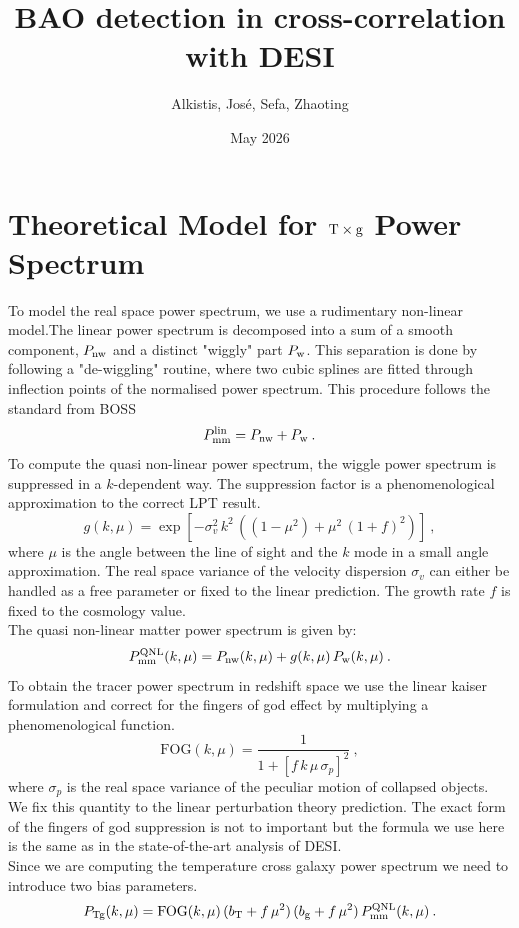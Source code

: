 \documentclass{article}
\title{BAO detection in cross-correlation with DESI}
\author{Alkistis, José, Sefa, Zhaoting}
\date{May 2026}
\begin{document}
\maketitle

\section{Theoretical Model for ${\rm T \times g}$ Power Spectrum}
    To model the real space power spectrum, we use a rudimentary non-linear model.The linear power spectrum is decomposed into a sum of a smooth component, $P_{\rm nw}$ and a distinct "wiggly" part $P_{\rm w}$. This separation is done by following a "de-wiggling" routine, where two cubic splines are fitted through inflection points of the normalised power spectrum. This procedure follows the standard from BOSS\\
    \begin{equation}
        P^{\rm lin}_{\rm mm} = P_{\rm nw} + P_{\rm w}\:.
    \end{equation}
    To compute the quasi non-linear power spectrum, the wiggle power spectrum is suppressed in a $k$-dependent way. The suppression factor is a phenomenological approximation to the correct LPT result.
    \begin{equation}
        g(k, \mu) = \exp\left[-\sigma_v^2\,k^2\,\left(\left(1-\mu^2\right) + \mu^2\,\left(1 + f\right)^2\right)\right]\:,
    \end{equation}
    where $\mu$ is the angle between the line of sight and the $k$ mode in a small angle approximation. The real space variance of the velocity dispersion $\sigma_v$ can either be handled as a free parameter or fixed to the linear prediction. The growth rate $f$ is fixed to the cosmology value.\\
    The quasi non-linear matter power spectrum is given by:
    \begin{equation}
        P_{\rm mm}^{\rm QNL}(k, \mu) = P_{\rm nw}(k, \mu) + g(k, \mu)\,P_{\rm w}(k, \mu)\:.
    \end{equation}
    To obtain the tracer power spectrum in redshift space we use the linear kaiser formulation and correct for the fingers of god effect by multiplying a phenomenological function.
    \begin{equation}
        \mathrm{FOG}(k, \mu) = \frac{1}{1 + \left[f\,k\,\mu\,\sigma_p\right]^2}\:,
    \end{equation}
    where $\sigma_p$ is the real space variance of the peculiar motion of collapsed objects. We fix this quantity to the linear perturbation theory prediction. The exact form of the fingers of god suppression is not to important but the formula we use here is the same as in the state-of-the-art analysis of DESI.\\
    Since we are computing the temperature cross galaxy power spectrum we need to introduce two bias parameters.
    \begin{equation}
        P_{\rm Tg}(k, \mu) = {\rm FOG}(k, \mu) \, (b_{\rm T} + f\,\mu^2)\,(b_{\rm g} + f\,\mu^2)\,P_{\rm mm}^{\rm QNL}(k, \mu)\:.
    \end{equation}
\end{document}
